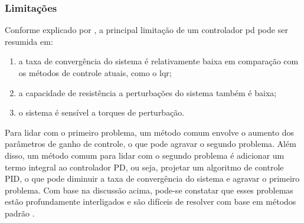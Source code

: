 \subsubsection{Limitações}

Conforme explicado por \cite{qi2022variable}, a principal limitação de um controlador \gls{pd} pode ser resumida em:

\begin{enumerate}[label=(\roman*)]
  \item a taxa de convergência do sistema é relativamente baixa em comparação com os métodos de controle atuais, como o \gls{lqr};
  \item a capacidade de resistência a perturbações do sistema também é baixa;
  \item o sistema é sensível a torques de perturbação.
\end{enumerate}

Para lidar com o primeiro problema, um método comum envolve o aumento dos parâmetros de ganho de controle, o que pode agravar o segundo problema.
Além disso, um método comum para lidar com o segundo problema é adicionar um termo integral ao controlador PD, ou seja, projetar um algoritmo de controle PID, o que pode diminuir a taxa de convergência do sistema e agravar o primeiro problema.
Com base na discussão acima, pode-se constatar que esses problemas estão profundamente interligados e são difíceis de resolver com base em métodos padrão \cite{qi2022variable}.
